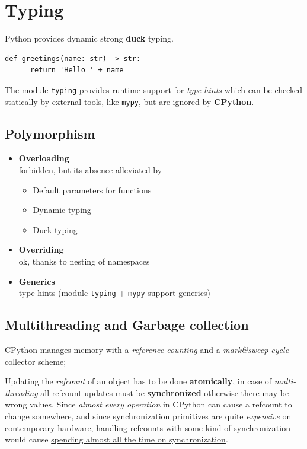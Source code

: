 \section{Typing}
Python provides dynamic strong \textbf{duck} typing.
\begin{lstlisting}[caption={Code can be annotated with types}]
   def greetings(name: str) -> str:
      return 'Hello ' + name
\end{lstlisting}
The module \lstinline|typing| provides runtime support for \textit{type hints} which can be checked statically by
external tools, like \lstinline|mypy|, but are ignored by \textbf{CPython}.

\subsection{Polymorphism}
\begin{itemize}
   \item \textbf{Overloading}\\
   forbidden, but its absence
   alleviated by
   \begin{itemize}
      \item Default parameters for functions
      \item Dynamic typing
      \item Duck typing
   \end{itemize}
   \item \textbf{Overriding}\\
   ok, thanks to nesting of
   namespaces
   \item \textbf{Generics}\\
   type hints (module \lstinline|typing| + \lstinline|mypy|
   support generics)
\end{itemize}

\subsection{Multithreading and Garbage collection}
CPython manages memory with a \textit{reference counting} and a
\textit{mark\&sweep cycle} collector scheme;

Updating the \textit{refcount} of an object has to be done \textbf{atomically}, 
in case of \textit{multi-threading} all refcount updates must be \textbf{synchronized} otherwise there may be wrong values.
Since \textit{almost every operation} in CPython can cause a refcount to change somewhere,
and since synchronization primitives are quite \textit{expensive} on
contemporary hardware, handling refcounts with some kind of
synchronization would cause \underline{spending almost all the time on synchronization}.

